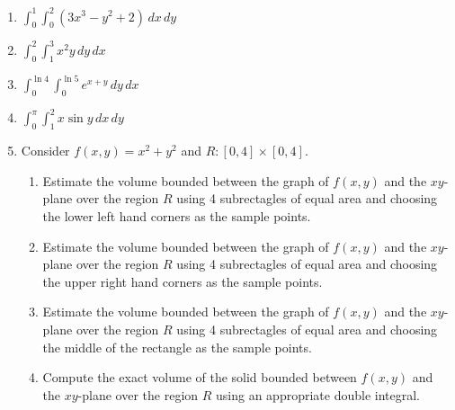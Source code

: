 \documentclass[12pt]{article}
\newif\ifans
\begin{document}
\begin{enumerate}

\item $\int_0^1\int_0^2\left(3x^3-y^2+2\right)\,dx\,dy$

\ifans{\fbox{$\frac{46}{3}$}} \fi

\item $\int_0^2\int_1^3 x^2y\,dy\,dx$

\ifans{\fbox{$\frac{32}{3}$}} \fi

\item $\int_0^{\ln{4}}\int_0^{\ln{5}}e^{x+y}\,dy\,dx$

\ifans{\fbox{$12$}} \fi

\item $\int_0^{\pi} \int_1^2 x\sin{y} \,dx \,dy$

\ifans{\fbox{$3$}} \fi

\newpage

\item Consider $f(x,y)=x^2+y^2$ and $R:[0,4]\times[0,4]$.

\begin{enumerate}

\item Estimate the volume bounded between the graph of $f(x,y)$ and the $xy$-plane over the region $R$ using 4 subrectagles of equal area and choosing the lower left hand corners as the sample points.

\ifans{\fbox{$64$}} \fi

\item Estimate the volume bounded between the graph of $f(x,y)$ and the $xy$-plane over the region $R$ using 4 subrectagles of equal area and choosing the upper right hand corners as the sample points.

\ifans{\fbox{$320$}} \fi

\item Estimate the volume bounded between the graph of $f(x,y)$ and the $xy$-plane over the region $R$ using 4 subrectagles of equal area and choosing the middle of the rectangle as the sample points.

\ifans{\fbox{$160$}} \fi

\item Compute the exact volume of the solid bounded between $f(x,y)$ and the $xy$-plane over the region $R$ using an appropriate double integral.

\ifans{\fbox{$\frac{512}{3}$}} \fi

\end{enumerate}


\end{enumerate}
\end{document}
